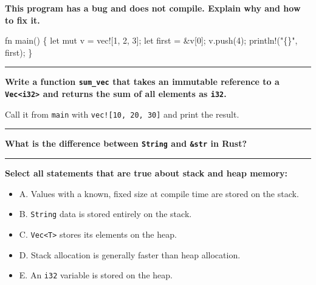 \documentclass[
  11pt,
]{article}
\newenvironment{Shaded}{}{}
\newcommand{\NormalTok}[1]{#1}
\providecommand{\tightlist}{%
  \setlength{\itemsep}{0pt}\setlength{\parskip}{0pt}}
\begin{document}
\textbf{This program has a bug and does not compile. Explain why and how
to fix it.}

\begin{Shaded}
\begin{Highlighting}[]
\NormalTok{fn main() \{}
\NormalTok{    let mut v = vec![1, 2, 3];}
\NormalTok{    let first = \&v[0];}
\NormalTok{    v.push(4);}
\NormalTok{    println!("\{\}", first);}
\NormalTok{\}}
\end{Highlighting}
\end{Shaded}

\begin{center}\rule{0.5\linewidth}{0.5pt}\end{center}

\textbf{Write a function \texttt{sum\_vec} that takes an immutable
reference to a \texttt{Vec\textless{}i32\textgreater{}} and returns the
sum of all elements as \texttt{i32}.}

Call it from \texttt{main} with \texttt{vec!{[}10,\ 20,\ 30{]}} and
print the result.

\begin{Shaded}
\begin{Highlighting}[]

\end{Highlighting}
\end{Shaded}

\begin{center}\rule{0.5\linewidth}{0.5pt}\end{center}

\textbf{What is the difference between \texttt{String} and
\texttt{\&str} in Rust?}

\begin{center}\rule{0.5\linewidth}{0.5pt}\end{center}

\textbf{Select all statements that are true about stack and heap
memory:}

\begin{itemize}
\tightlist
\item[$\square$]
  A. Values with a known, fixed size at compile time are stored on the
  stack.
\item[$\square$]
  B. \texttt{String} data is stored entirely on the stack.
\item[$\square$]
  C. \texttt{Vec\textless{}T\textgreater{}} stores its elements on the
  heap.
\item[$\square$]
  D. Stack allocation is generally faster than heap allocation.
\item[$\square$]
  E. An \texttt{i32} variable is stored on the heap.
\end{itemize}
\end{document}
